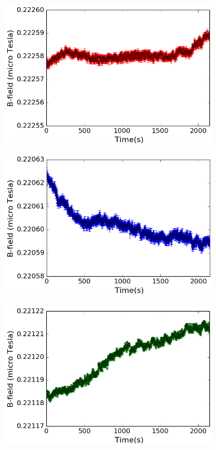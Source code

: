 \begin{figure}
  \centering
  \begin{subfigure}[b]{0.48\textwidth}
    \centering
    \includegraphics[width=\textwidth]{figures/ramp_1}
    \caption{}
    \label{fig:ramp-up}
  \end{subfigure}
  \hfill
  \begin{subfigure}[b]{0.48\textwidth}
    \centering
    \includegraphics[width=\textwidth]{figures/ramp_2}
    \caption{}
    \label{fig:ramp-down}
  \end{subfigure}
  \begin{subfigure}[b]{0.48\textwidth}
    \centering
    \includegraphics[width=\textwidth]{figures/ramp3}

\end{subfigure}
\end{figure}
